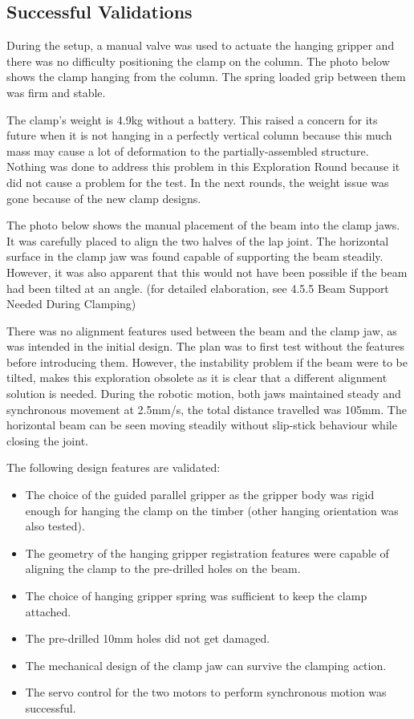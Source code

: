 \subsection{Successful Validations}
\label{subsection:exploration_1_successful_validations}

During the setup, a manual valve was used to actuate the hanging gripper and there was no difficulty positioning the clamp on the column. The photo below shows the clamp hanging from the column. The spring loaded grip between them was firm and stable. 

The clamp’s weight is 4.9kg without a battery. This raised a concern for its future when it is not hanging in a perfectly vertical column because this much mass may cause a lot of deformation to the partially-assembled structure. Nothing was done to address this problem in this Exploration Round because it did not cause a problem for the test. In the next rounds, the weight issue was gone because of the new clamp designs. 

The photo below shows the manual placement of the beam into the clamp jaws. It was carefully placed to align the two halves of the lap joint. The horizontal surface in the clamp jaw was found capable of supporting the beam steadily. However, it was also apparent that this would not have been possible if the beam had been tilted at an angle. (for detailed elaboration, see 4.5.5 Beam Support Needed During Clamping)

There was no alignment features used between the beam and the clamp jaw, as was intended in the initial design. The plan was to first test without the features before introducing them. However, the instability problem if the beam were to be tilted, makes this exploration obsolete as it is clear that a different alignment solution is needed.
During the robotic motion, both jaws maintained steady and synchronous movement at 2.5mm/s, the total distance travelled was 105mm. The horizontal beam can be seen moving steadily without slip-stick behaviour while closing the joint.  

The following design features are validated:
\begin{itemize}
    \item The choice of the guided parallel gripper as the gripper body was rigid enough for hanging the clamp on the timber (other hanging orientation was also tested).
    \item The geometry of the hanging gripper registration features were capable of aligning the clamp to the pre-drilled holes on the beam.
    \item The choice of hanging gripper spring was sufficient to keep the clamp attached.
    \item The pre-drilled 10mm holes did not get damaged.
    \item The mechanical design of the clamp jaw can survive the clamping action.
    \item The servo control for the two motors to perform synchronous motion was successful.
\end{itemize}

